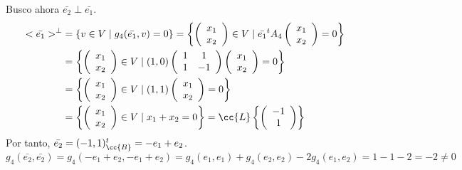 \begin{ejercicio}
\begin{enumerate}
        Busco ahora $\bar{e_2} \perp \bar{e_1}$.
        \begin{equation*}\begin{split}
            <\bar{e_1}>^\perp &= \{v \in V \mid g_4(\bar{e_1},v) = 0\} 
            = \left\{ \left(\begin{array}{c}
                 x_1 \\ x_2
            \end{array} \right) \in V \mid \bar{e_1}^t A_4
            \left(\begin{array}{c}
                 x_1 \\ x_2
            \end{array} \right) = 0\right\} \\
            &= \left\{ \left(\begin{array}{c}
                 x_1 \\ x_2
            \end{array} \right) \in V \mid (1,0)\left(\begin{array}{cc}
                1 & 1 \\
                1 & -1
            \end{array} \right) 
            \left(\begin{array}{c}
                 x_1 \\ x_2
            \end{array} \right) = 0\right\} \\
            &= \left\{ \left(\begin{array}{c}
                 x_1 \\ x_2
            \end{array} \right) \in V \mid (1,1)
            \left(\begin{array}{c}
                 x_1 \\ x_2
            \end{array} \right) = 0\right\} \\
            &= \left\{ \left(\begin{array}{c}
                 x_1 \\ x_2
            \end{array} \right) \in V \mid x_1+x_2 = 0\right\}
            = \cc{L} \left\{ \left(\begin{array}{c}
                 -1 \\ 1
            \end{array} \right) \right\}
        \end{split}\end{equation*}
        Por tanto, $\bar{e_2} = (-1,1)^t_\cc{B} = -e_1+e_2$.
        \begin{equation*}
            g_4(\bar{e_2}, \bar{e_2}) = g_4(-e_1+e_2, -e_1+e_2) = g_4(e_1,e_1) + g_4(e_2,e_2) - 2g_4(e_1, e_2) = 1-1-2=-2 \neq 0
        \end{equation*}


\end{enumerate}
\end{ejercicio}
